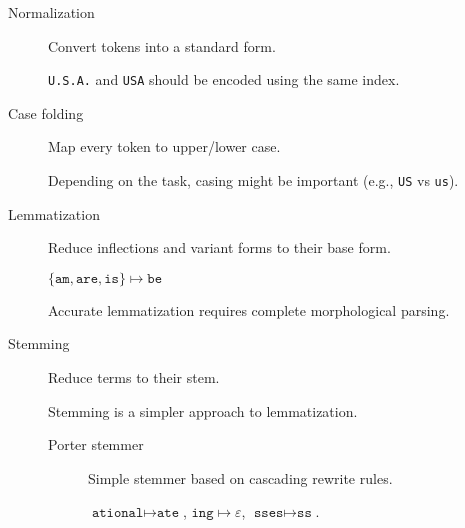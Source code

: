 \begin{description}
    \item[Normalization] 
        Convert tokens into a standard form.

        \begin{example}
            \texttt{U.S.A.} and \texttt{USA} should be encoded using the same index.
        \end{example}

    \item[Case folding] 
        Map every token to upper/lower case.

        \begin{remark}
            Depending on the task, casing might be important (e.g., \texttt{US} vs \texttt{us}).
        \end{remark}

    \item[Lemmatization] 
        Reduce inflections and variant forms to their base form.

        \begin{example}
            $\{ \texttt{am}, \texttt{are}, \texttt{is} \} \mapsto \texttt{be}$
        \end{example}

        \begin{remark}
            Accurate lemmatization requires complete morphological parsing.
        \end{remark}

    \item[Stemming] 
        Reduce terms to their stem.

        \begin{remark}
            Stemming is a simpler approach to lemmatization.
        \end{remark}

        \begin{description}
            \item[Porter stemmer]
                Simple stemmer based on cascading rewrite rules.

                \begin{example}
                    $\texttt{ational} \mapsto \texttt{ate}$, 
                    $\texttt{ing} \mapsto \varepsilon$,
                    $\texttt{sses} \mapsto \texttt{ss}$.
                \end{example}
        \end{description}
\end{description}



